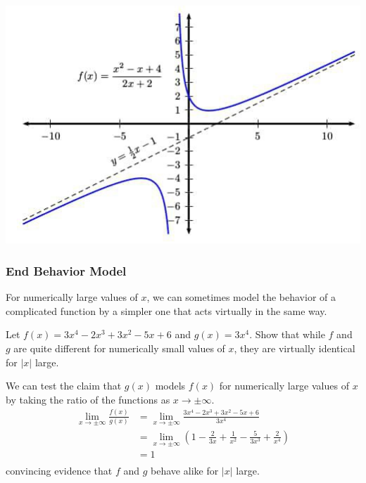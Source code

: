 \documentclass[12pt]{article}
\begin{document}
\begin{minipage}{0.33\textwidth}
    \begin{center}
        \includegraphics[scale=0.3]{Oblique asymptotes.jpeg}
    \end{center}
\end{minipage}


\subsubsection{End Behavior Model}
For numerically large values of $x$, we can sometimes model the behavior of a complicated function by a simpler one that acts virtually in the same way.

\begin{example}{Let $f(x) = 3x^4 - 2x^3 + 3x^2 - 5x + 6$ and $g(x) = 3x^4$. Show that while $f$ and $g$ are quite different for numerically small values of $x$, they are virtually identical for $|x|$ large.}
    
    We can test the claim that $g(x)$ models $f(x)$ for numerically large values of $x$ by taking the ratio of the functions as $x \to \pm \infty$. \\
    \begin{align*}
        \lim_{x \to \pm\infty} \frac{f(x)}{g(x)} &= \lim_{x \to \pm\infty} \frac{3x^4-2x^3+3x^2-5x+6}{3x^4} \\
        &= \lim_{x \to \pm\infty} \left( 1 - \frac{2}{3x} + \frac{1}{x^2} - \frac{5}{3x^3} + \frac{2}{x^4} \right)  \\
        &= 1 \\
    \end{align*}
    convincing evidence that $f$ and $g$ behave alike for $|x|$ large.
\end{example}
\end{document}
